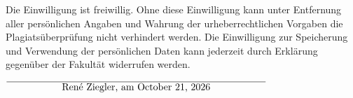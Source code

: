\documentclass[12pt,oneside,a4paper,parskip]{scrbook}
\def\BaAuthor{René Ziegler}
\begin{document}
\begin{small}
Die Einwilligung ist freiwillig. Ohne diese Einwilligung kann unter Entfernung aller persönlichen Angaben und Wahrung der urheberrechtlichen Vorgaben die Plagiatsüberprüfung nicht verhindert werden. Die Einwilligung zur Speicherung und Verwendung der persönlichen Daten kann jederzeit durch Erklärung gegenüber der Fakultät widerrufen werden.
\end{small}

\vspace{20pt}
\begin{flushright}
$\overline{~~~~~~~~~~~~~~~~~\mbox{\BaAuthor, am \today}~~~~~~~~~~~~~~~~~}$
\end{flushright}
\end{document}
